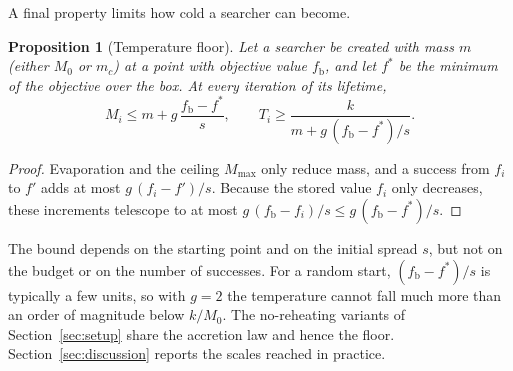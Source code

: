 \documentclass[10pt,a4paper]{article}
\newtheorem{proposition}{Proposition}
\begin{document}
A final property limits how cold a searcher can become.

\begin{proposition}[Temperature floor]
\label{prop:floor}
Let a searcher be created with mass $m$ (either $M_0$ or $m_c$) at a point with
objective value $f_{\mathrm b}$, and let $f^\ast$ be the minimum of the
objective over the box. At every iteration of its lifetime,
\begin{equation}
  M_i \le m + g\,\frac{f_{\mathrm b}-f^\ast}{s},\qquad
  T_i \ge \frac{k}{m + g\,(f_{\mathrm b}-f^\ast)/s}.
  \label{eq:floor}
\end{equation}
\end{proposition}
\begin{proof}
Evaporation and the ceiling $M_{\max}$ only reduce mass, and a success from
$f_i$ to $f'$ adds at most $g\,(f_i-f')/s$. Because the stored value $f_i$ only
decreases, these increments telescope to at most
$g\,(f_{\mathrm b}-f_i)/s\le g\,(f_{\mathrm b}-f^\ast)/s$.
\end{proof}

The bound depends on the starting point and on the initial spread $s$, but not
on the budget or on the number of successes. For a random start,
$(f_{\mathrm b}-f^\ast)/s$ is typically a few units, so with $g=2$ the
temperature cannot fall much more than an order of magnitude below $k/M_0$. The
no-reheating variants of Section~\ref{sec:setup} share the accretion law and
hence the floor. Section~\ref{sec:discussion} reports the scales reached in
practice.
\end{document}
